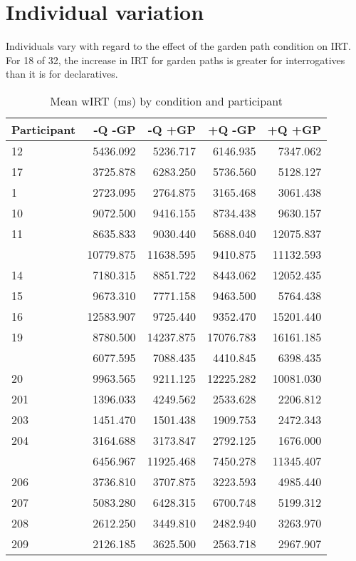 \documentclass[]{tufte-handout}
\begin{document}
\section{Individual variation}\label{individual-variation}

Individuals vary with regard to the effect of the garden path condition
on IRT. For 18 of 32, the increase in IRT for garden paths is greater
for interrogatives than it is for declaratives.

\begin{longtable}{lrrrr}
\caption{\label{tab:pPattern}Mean wIRT (ms) by condition and participant}\\
\toprule
Participant & -Q -GP & -Q +GP & +Q -GP & +Q +GP\\
\midrule
12 & 5436.092 & 5236.717 & 6146.935 & 7347.062\\
17 & 3725.878 & 6283.250 & 5736.560 & 5128.127\\
1 & 2723.095 & 2764.875 & 3165.468 & 3061.438\\
10 & 9072.500 & 9416.155 & 8734.438 & 9630.157\\
11 & 8635.833 & 9030.440 & 5688.040 & 12075.837\\
\addlinespace
13 & 10779.875 & 11638.595 & 9410.875 & 11132.593\\
14 & 7180.315 & 8851.722 & 8443.062 & 12052.435\\
15 & 9673.310 & 7771.158 & 9463.500 & 5764.438\\
16 & 12583.907 & 9725.440 & 9352.470 & 15201.440\\
19 & 8780.500 & 14237.875 & 17076.783 & 16161.185\\
\addlinespace
2 & 6077.595 & 7088.435 & 4410.845 & 6398.435\\
20 & 9963.565 & 9211.125 & 12225.282 & 10081.030\\
201 & 1396.033 & 4249.562 & 2533.628 & 2206.812\\
203 & 1451.470 & 1501.438 & 1909.753 & 2472.343\\
204 & 3164.688 & 3173.847 & 2792.125 & 1676.000\\
\addlinespace
205 & 6456.967 & 11925.468 & 7450.278 & 11345.407\\
206 & 3736.810 & 3707.875 & 3223.593 & 4985.440\\
207 & 5083.280 & 6428.315 & 6700.748 & 5199.312\\
208 & 2612.250 & 3449.810 & 2482.940 & 3263.970\\
209 & 2126.185 & 3625.500 & 2563.718 & 2967.907\\

\end{longtable}
\end{document}
